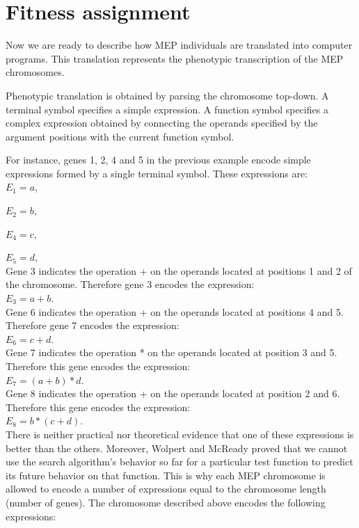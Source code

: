 \documentclass [11pt]{article}
\begin{document}
\section{Fitness assignment}
\label{MEP_fitness}

Now we are ready to describe how MEP individuals are translated into 
computer programs. This translation represents the phenotypic transcription 
of the MEP chromosomes.

Phenotypic translation is obtained by parsing the chromosome top-down. A 
terminal symbol specifies a simple expression. A function symbol specifies a 
complex expression obtained by connecting the operands specified by the 
argument positions with the current function symbol.

For instance, genes 1, 2, 4 and 5 in the previous example encode simple 
expressions formed by a single terminal symbol. These expressions are:\\

$E_{1} = a$,

$E_{2} = b$,

$E_{4} = c$,

$E_{5} = d$,\\

Gene 3 indicates the operation + on the operands located at positions 1 and 
2 of the chromosome. Therefore gene 3 encodes the expression:\\

$E_{3}=a+b$.\\

Gene 6 indicates the operation + on the operands located at positions 4 and 
5. Therefore gene 7 encodes the expression:\\

$E_{6}=c+d$.\\

Gene 7 indicates the operation * on the operands located at position 3 and 
5. Therefore this gene encodes the expression:\\

$E_{7}=(a+b)*d$.\\

Gene 8 indicates the operation + on the operands located at position 2 and 
6. Therefore this gene encodes the expression:\\

$E_{8}=b*(c+d)$.\\


There is neither practical nor theoretical evidence that one of these 
expressions is better than the others. Moreover, Wolpert and McReady \cite{wolpert1,wolpert2} 
proved that we cannot use the search algorithm's behavior so far for a 
particular test function to predict its future behavior on that function. 
This is why each MEP chromosome is allowed to encode a number of expressions 
equal to the chromosome length (number of genes). The chromosome described 
above encodes the following expressions:\\
\end{document}
